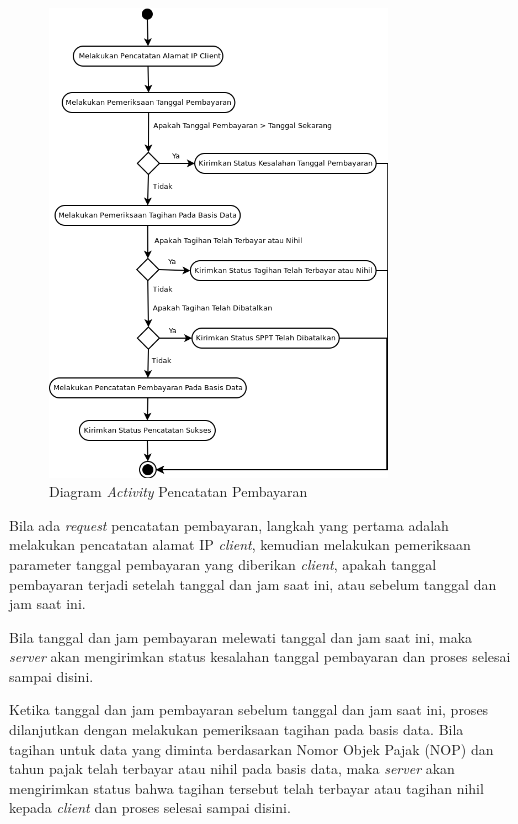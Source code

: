 \documentclass[pdftex,12pt, oneside]{article}
\begin{document}
\begin{figure}[H]
  \centering
  \includegraphics[width=0.8\textwidth]{./resources/diagram/uml-act-bayar}
  \caption{Diagram \textit{Activity} Pencatatan Pembayaran}
  \label{fig:uml-act-bayar}
\end{figure}

Bila ada \textit{request} pencatatan pembayaran, langkah yang pertama adalah melakukan pencatatan alamat IP \textit{client}, kemudian melakukan pemeriksaan parameter tanggal pembayaran yang diberikan \textit{client}, apakah tanggal pembayaran terjadi setelah tanggal dan jam saat ini, atau sebelum tanggal dan jam saat ini.

Bila tanggal dan jam pembayaran melewati tanggal dan jam saat ini, maka \textit{server} akan mengirimkan status kesalahan tanggal pembayaran dan proses selesai sampai disini.

Ketika tanggal dan jam pembayaran sebelum tanggal dan jam saat ini, proses dilanjutkan dengan melakukan pemeriksaan tagihan pada basis data. Bila tagihan untuk data yang diminta berdasarkan Nomor Objek Pajak (NOP) dan tahun pajak telah terbayar atau nihil pada basis data, maka \textit{server} akan mengirimkan status bahwa tagihan tersebut telah terbayar atau tagihan nihil kepada \textit{client} dan proses selesai sampai disini.
\end{document}
